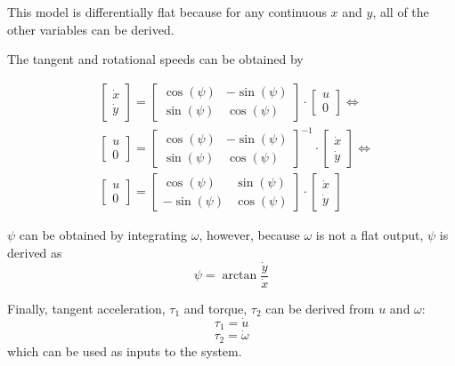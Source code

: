 \par This model is differentially flat because for any continuous $x$ and $y$, all of the other variables can be derived.
\par The tangent and rotational speeds can be obtained by
    
\begin{equation}
\begin{split}
    & \begin{bmatrix}
        \dot{x} \\ \dot{y}
    \end{bmatrix} = 
    \begin{bmatrix}
        \cos(\psi) & - \sin(\psi) \\
        \sin(\psi) & \cos(\psi)
    \end{bmatrix} \cdot
    \begin{bmatrix}
        u \\ 0
    \end{bmatrix} \Leftrightarrow  \\
    & \begin{bmatrix}
        u \\ 0
    \end{bmatrix} = 
    \begin{bmatrix}
        \cos(\psi) & - \sin(\psi) \\
        \sin(\psi) & \cos(\psi)
    \end{bmatrix}^{-1} \cdot
    \begin{bmatrix}
        \dot{x} \\ \dot{y}
    \end{bmatrix} \Leftrightarrow \\
    & \begin{bmatrix}
        u \\ 0
    \end{bmatrix} = 
    \begin{bmatrix}
        \cos(\psi) & \sin(\psi) \\
        - \sin(\psi) & \cos(\psi)
    \end{bmatrix} \cdot
    \begin{bmatrix}
        \dot{x} \\ \dot{y}
    \end{bmatrix}
\end{split}
\end{equation}
\par $\psi$ can be obtained by integrating $\omega$, however, because $\omega$ is not a flat output, $\psi$ is derived as
\begin{equation}
    \psi = \arctan{\frac{\dot{y}}{\dot{x}}}
\end{equation}
\par Finally, tangent acceleration, $\tau_1$ and torque, $\tau_2$ can be derived from $u$ and $\omega$:
\begin{equation}
    \tau_1 = \dot{u}
\end{equation}
\begin{equation}
    \tau_2 = \dot{\omega}
\end{equation}
which can be used as inputs to the system.
